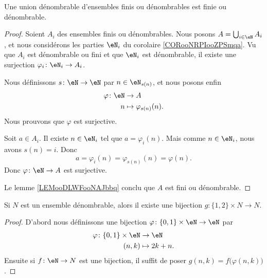 \begin{proposition}     \label{PROPooENTPooSPpmhY}
    Une union dénombrable d'ensembles finis ou dénombrables est finie ou dénombrable.
\end{proposition}

\begin{proof}
    Soient \( A_i\) des ensembles finis ou dénombrables. Nous posons \( A=\bigcup_{i\in \eN}A_i\), et nous considérons les parties \( \eN_i\) du corolaire \ref{CORooNRPIooZPSmqa}. Vu que \( A_i\) est dénombrable ou fini et que \( \eN_i\) est dénombrable, il existe une surjection \( \varphi_i\colon \eN_i\to A_i\).

    Nous définissons \( s\colon \eN\to \eN\) par \( n\in \eN_{s(n)}\), et nous posons enfin
    \begin{equation}
        \begin{aligned}
            \varphi\colon \eN&\to A \\
            n&\mapsto \varphi_{s(n)}(n). 
        \end{aligned}
    \end{equation}
    Nous prouvons que \( \varphi\) est surjective.

    Soit \( a\in A_i\). Il existe \( n\in \eN_i\) tel que \( a=\varphi_i(n)\). Mais comme \( n\in \eN_i\), nous avons \( s(n)=i\). Donc
    \begin{equation}
        a=\varphi_i(n)=\varphi_{s(n)}(n)=\varphi(n).
    \end{equation}
    Donc \( \varphi\colon \eN\to A\) est surjective.

    Le lemme \ref{LEMooDLWFooNAJbbq} conclu que \( A\) est fini ou dénombrable.
\end{proof}

\begin{lemma}        \label{LEMooRXSRooBUWOyb}
    Si \( N\) est un ensemble dénombrable, alors il existe une bijection \( g\colon \{ 1,2 \}\times N\to N\).
\end{lemma}

\begin{proof}
    D'abord nous définissons une bijection \( \varphi\colon \{ 0,1 \}\times \eN\to \eN\) par
    \begin{equation}
        \begin{aligned}
            \varphi\colon \{ 0,1 \}\times \eN&\to \eN \\
            (n,k)&\mapsto 2k+n. 
        \end{aligned}
    \end{equation}
    Ensuite si \( f\colon \eN\to N\) est une bijection, il suffit de poser \( g(n,k)=f\big( \varphi(n,k) \big)\).
\end{proof}

